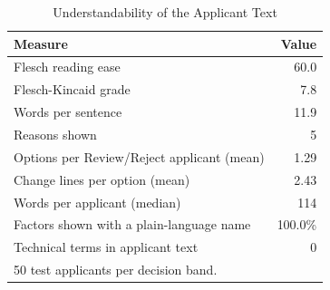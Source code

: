 \begin{table}[t]
\caption{Understandability of the Applicant Text}
\label{tab:understandability}
\centering
\setlength{\tabcolsep}{4pt}
\begin{tabular}{lr}
\hline
\textbf{Measure} & \textbf{Value} \\
\hline
Flesch reading ease & 60.0 \\
Flesch-Kincaid grade & 7.8 \\
Words per sentence & 11.9 \\
Reasons shown & 5 \\
Options per Review/Reject applicant (mean) & 1.29 \\
Change lines per option (mean) & 2.43 \\
Words per applicant (median) & 114 \\
Factors shown with a plain-language name & 100.0\% \\
Technical terms in applicant text & 0 \\
\hline
\multicolumn{2}{p{0.92\linewidth}}{\footnotesize 50 test applicants per decision band.} \\
\end{tabular}
\end{table}

